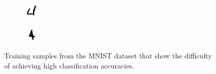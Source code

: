 \documentclass[10pt,twocolumn]{article}
\begin{document}
\begin{figure}
\begin{subfigure}{.23\textwidth}
	\end{subfigure}
	\begin{subfigure}{.23\textwidth}
		\includegraphics[width=\textwidth]{figure/mnist3}
	\end{subfigure}
	\begin{subfigure}{.23\textwidth}
		\includegraphics[width=\textwidth]{figure/mnist4}
	\end{subfigure}
	\caption{Training samples from the MNIST dataset that show the difficulty of achieving high classification accuracies.}
	\label{fig:mnist}
\end{figure}
\end{document}
